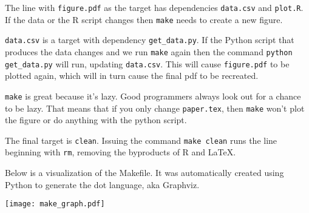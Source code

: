 \documentclass[12pt]{article}
\begin{document}
The line with {\tt figure.pdf} as the target has dependencies {\tt data.csv} and {\tt plot.R}. If the data or the R script changes then {\tt make} needs to create a new figure.

{\tt data.csv} is a target with dependency {\tt get\_data.py}. If the Python script that produces the data changes and we run {\tt make} again then the command {\tt python get\_data.py} will run, updating {\tt data.csv}. This will cause {\tt figure.pdf} to be plotted again, which will in turn cause the final pdf to be recreated.

{\tt make} is great because it's lazy. Good programmers always look out for a chance to be lazy. That means that if you only change {\tt paper.tex}, then {\tt make} won't plot the figure or do anything with the python script.

The final target is {\tt clean}. Issuing the command {\tt make clean} runs the line beginning with {\tt rm}, removing the byproducts of R and \LaTeX.

Below is a visualization of the Makefile. It was automatically created using Python to generate the dot language, aka Graphviz.

\centerline{\texttt{[image: make\_graph.pdf]}}
\end{document}

